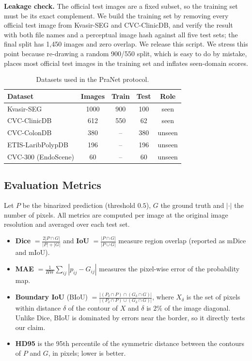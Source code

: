 \documentclass[journal]{IEEEtran}
\begin{document}
\textbf{Leakage check.} The official test images are a fixed subset, so the training set must be its exact complement. We build the training set by removing every official test image from Kvasir-SEG and CVC-ClinicDB, and verify the result with both file names and a perceptual image hash against all five test sets; the final split has 1,450 images and zero overlap. We release this script. We stress this point because re-drawing a random 900/550 split, which is easy to do by mistake, places most official test images in the training set and inflates seen-domain scores.

\begin{table}[t]
\centering
\caption{Datasets used in the PraNet protocol.}
\label{tab:datasets}
\setlength{\tabcolsep}{4pt}
\begin{tabular}{l c c c c}
\toprule
Dataset & Images & Train & Test & Role \\
\midrule
Kvasir-SEG \cite{jha2020kvasir}           & 1000 & 900 & 100 & seen \\
CVC-ClinicDB \cite{bernal2015clinicdb}    & 612  & 550 & 62  & seen \\
CVC-ColonDB \cite{tajbakhsh2016colondb}   & 380  & --  & 380 & unseen \\
ETIS-LaribPolypDB \cite{silva2014etis}    & 196  & --  & 196 & unseen \\
CVC-300 (EndoScene) \cite{vazquez2017endoscene} & 60 & -- & 60 & unseen \\
\bottomrule
\end{tabular}
\end{table}

\subsection{Evaluation Metrics}
Let $P$ be the binarized prediction (threshold $0.5$), $G$ the ground truth and $|\cdot|$ the number of pixels. All metrics are computed per image at the original image resolution and averaged over each test set.
\begin{itemize}
  \item \textbf{Dice} $=\frac{2|P\cap G|}{|P|+|G|}$ and \textbf{IoU} $=\frac{|P\cap G|}{|P\cup G|}$ measure region overlap (reported as mDice and mIoU).
  \item \textbf{MAE} $=\frac{1}{HW}\sum_{ij}|p_{ij}-G_{ij}|$ measures the pixel-wise error of the probability map.
  \item \textbf{Boundary IoU} (BIoU) \cite{cheng2021boundaryiou} $=\frac{|(P_\delta\cap P)\cap(G_\delta\cap G)|}{|(P_\delta\cap P)\cup(G_\delta\cap G)|}$, where $X_\delta$ is the set of pixels within distance $\delta$ of the contour of $X$ and $\delta$ is $2\%$ of the image diagonal. Unlike Dice, BIoU is dominated by errors near the border, so it directly tests our claim.
  \item \textbf{HD95} is the 95th percentile of the symmetric distance between the contours of $P$ and $G$, in pixels; lower is better.
\end{itemize}
\end{document}
